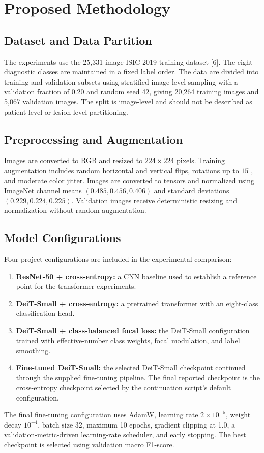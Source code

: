 \documentclass[conference]{IEEEtran}
\begin{document}
\section{Proposed Methodology}
\subsection{Dataset and Data Partition}
The experiments use the 25,331-image ISIC 2019 training dataset [6]. The eight diagnostic classes are maintained in a fixed label order. The data are divided into training and validation subsets using stratified image-level sampling with a validation fraction of 0.20 and random seed 42, giving 20,264 training images and 5,067 validation images. The split is image-level and should not be described as patient-level or lesion-level partitioning.

\subsection{Preprocessing and Augmentation}
Images are converted to RGB and resized to $224\times224$ pixels. Training augmentation includes random horizontal and vertical flips, rotations up to $15^\circ$, and moderate color jitter. Images are converted to tensors and normalized using ImageNet channel means $(0.485,0.456,0.406)$ and standard deviations $(0.229,0.224,0.225)$. Validation images receive deterministic resizing and normalization without random augmentation.

\subsection{Model Configurations}
Four project configurations are included in the experimental comparison:
\begin{enumerate}
\item \textbf{ResNet-50 + cross-entropy:} a CNN baseline used to establish a reference point for the transformer experiments.
\item \textbf{DeiT-Small + cross-entropy:} a pretrained transformer with an eight-class classification head.
\item \textbf{DeiT-Small + class-balanced focal loss:} the DeiT-Small configuration trained with effective-number class weights, focal modulation, and label smoothing.
\item \textbf{Fine-tuned DeiT-Small:} the selected DeiT-Small checkpoint continued through the supplied fine-tuning pipeline. The final reported checkpoint is the cross-entropy checkpoint selected by the continuation script's default configuration.
\end{enumerate}
The final fine-tuning configuration uses AdamW, learning rate $2\times10^{-5}$, weight decay $10^{-4}$, batch size 32, maximum 10 epochs, gradient clipping at 1.0, a validation-metric-driven learning-rate scheduler, and early stopping. The best checkpoint is selected using validation macro F1-score.
\end{document}
